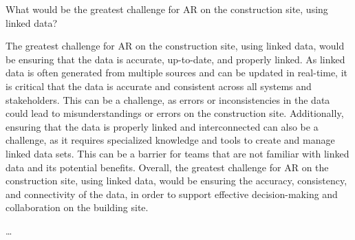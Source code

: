 \begin{description}
	\me What would be the greatest challenge for AR on the construction site, using linked data?

	\gpt The greatest challenge for AR on the construction site, using linked data, would be ensuring that the data is accurate, up-to-date, and properly linked.
	As linked data is often generated from multiple sources and can be updated in real-time, it is critical that the data is accurate and consistent across all systems and stakeholders. This can be a challenge, as errors or inconsistencies in the data could lead to misunderstandings or errors on the construction site.
	Additionally, ensuring that the data is properly linked and interconnected can also be a challenge, as it requires specialized knowledge and tools to create and manage linked data sets. This can be a barrier for teams that are not familiar with linked data and its potential benefits.
	Overall, the greatest challenge for AR on the construction site, using linked data, would be ensuring the accuracy, consistency, and connectivity of the data, in order to support effective decision-making and collaboration on the building site.

	\dots
\end{description}